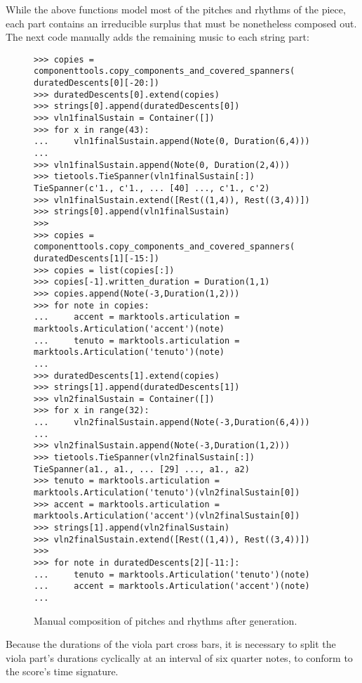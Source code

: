 While the above functions model most of the pitches and rhythms of the piece, each part contains an irreducible surplus that must be nonetheless composed out. The next code manually adds the remaining music to each string part:

\begin{figure}[H] 
\begin{lstlisting}[basicstyle=\scriptsize\ttfamily, breaklines=True, tabsize=4, showtabs=false, showspaces=false]
>>> copies = componenttools.copy_components_and_covered_spanners( duratedDescents[0][-20:])
>>> duratedDescents[0].extend(copies)
>>> strings[0].append(duratedDescents[0])
>>> vln1finalSustain = Container([])
>>> for x in range(43):
... 	vln1finalSustain.append(Note(0, Duration(6,4)))
... 
>>> vln1finalSustain.append(Note(0, Duration(2,4)))
>>> tietools.TieSpanner(vln1finalSustain[:])
TieSpanner(c'1., c'1., ... [40] ..., c'1., c'2)
>>> vln1finalSustain.extend([Rest((1,4)), Rest((3,4))])
>>> strings[0].append(vln1finalSustain)
>>> 
>>> copies = componenttools.copy_components_and_covered_spanners( duratedDescents[1][-15:])
>>> copies = list(copies[:])
>>> copies[-1].written_duration = Duration(1,1)
>>> copies.append(Note(-3,Duration(1,2)))
>>> for note in copies:
... 	accent = marktools.articulation = marktools.Articulation('accent')(note)
... 	tenuto = marktools.articulation = marktools.Articulation('tenuto')(note)
... 
>>> duratedDescents[1].extend(copies)
>>> strings[1].append(duratedDescents[1])
>>> vln2finalSustain = Container([])
>>> for x in range(32):
... 	vln2finalSustain.append(Note(-3,Duration(6,4)))
... 
>>> vln2finalSustain.append(Note(-3,Duration(1,2)))
>>> tietools.TieSpanner(vln2finalSustain[:])
TieSpanner(a1., a1., ... [29] ..., a1., a2)
>>> tenuto = marktools.articulation = marktools.Articulation('tenuto')(vln2finalSustain[0])
>>> accent = marktools.articulation = marktools.Articulation('accent')(vln2finalSustain[0])
>>> strings[1].append(vln2finalSustain)
>>> vln2finalSustain.extend([Rest((1,4)), Rest((3,4))])
>>> 
>>> for note in duratedDescents[2][-11:]:
... 	tenuto = marktools.Articulation('tenuto')(note)
... 	accent = marktools.Articulation('accent')(note)
... \end{lstlisting}

\caption{Manual composition of pitches and rhythms after generation. } 
\end{figure}

Because the durations of the viola part cross bars, it is necessary to split the viola part's durations cyclically at an interval of six quarter notes, to conform to the score's time signature.

